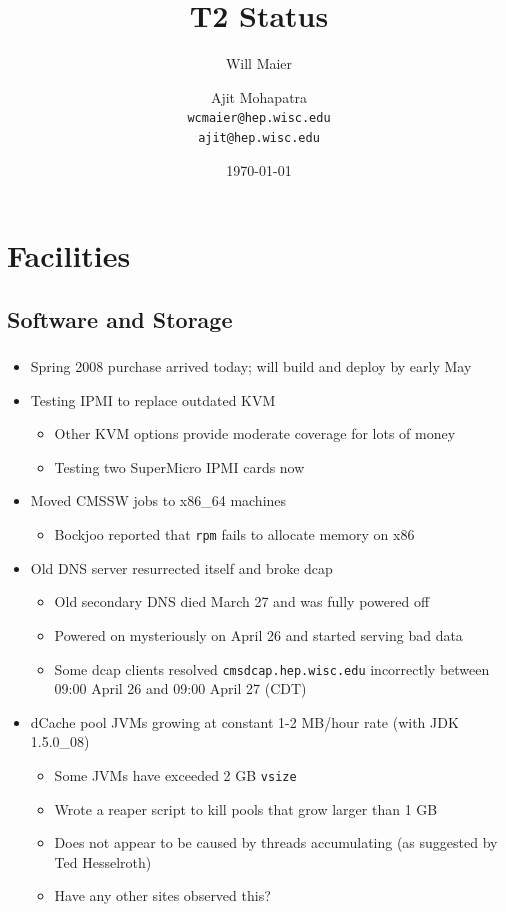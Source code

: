 \documentclass{beamer}
\title{T2 Status}
\author[Maier, Mohapatra]{
    Will Maier \and Ajit Mohapatra\\ 
    {\tt wcmaier@hep.wisc.edu}\\
    {\tt ajit@hep.wisc.edu}}
\institute[Wisconsin]{University of Wisconsin - High Energy Physics}
\date{\today}
\begin{document}
\begin{frame}
    \titlepage
\end{frame}


\section{Facilities}
\subsection{Software and Storage}
\begin{frame}
\frametitle{}
\begin{itemize}
    \item Spring 2008 purchase arrived today; will build and deploy by early May
    \item Testing IPMI to replace outdated KVM
    \begin{itemize}
        \item Other KVM options provide moderate coverage for lots of money
        \item Testing two SuperMicro IPMI cards now
    \end{itemize}
    \item Moved CMSSW jobs to x86\_64 machines
    \begin{itemize}
        \item Bockjoo reported that {\tt rpm} fails to allocate memory on x86
    \end{itemize}
    \item Old DNS server resurrected itself and broke dcap
    \begin{itemize}
        \item Old secondary DNS died March 27 and was fully powered off
        \item Powered on mysteriously on April 26 and started serving bad data
        \item Some dcap clients resolved {\tt cmsdcap.hep.wisc.edu} incorrectly between 09:00 April 26 and 09:00 April 27 (CDT)
    \end{itemize}
    \item dCache pool JVMs growing at constant 1-2 MB/hour rate (with JDK 1.5.0\_08)
    \begin{itemize}
        \item Some JVMs have exceeded 2 GB {\tt vsize}
        \item Wrote a reaper script to kill pools that grow larger than 1 GB
        \item Does not appear to be caused by threads accumulating (as suggested by Ted Hesselroth)
        \item Have any other sites observed this?
    \end{itemize}
\end{itemize}
\end{frame}
\end{document}
